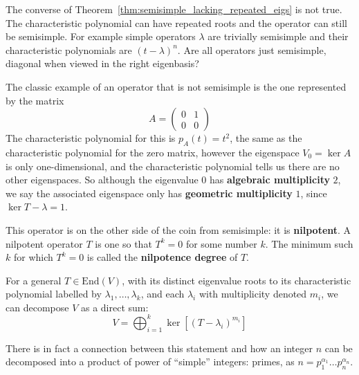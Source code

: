 \begin{appendices}
	The converse of Theorem~\ref{thm:semisimple_lacking_repeated_eigs} is not true. The characteristic polynomial can have repeated roots and the operator can still be semisimple. For example simple operators $\lambda$ are trivially semisimple and their characteristic polynomials are $(t-\lambda)^n$. Are all operators just semisimple, diagonal when viewed in the right eigenbasis?
	
	The classic example of an operator that is not semisimple is the one represented by the matrix
	\begin{equation*}
		A= \begin{pmatrix}
			 0 & 1 \\
			 0 & 0
		\end{pmatrix}
	\end{equation*}
	The characteristic polynomial for this is $p_A(t) = t^2$, the same as the characteristic polynomial for the zero matrix, however the eigenspace $V_0 = \ker A$ is only one-dimensional, and the characteristic polynomial tells us there are no other eigenspaces. So although the eigenvalue $0$ has \textbf{algebraic multiplicity} $2$, we say the associated eigenspace only has \textbf{geometric multiplicity} $1$, since $\ker T - \lambda = 1$.
	
	This operator is on the other side of the coin from semisimple: it is \textbf{nilpotent}. A nilpotent operator $T$ is one so that $T^k = 0$ for some number $k$. The minimum such $k$ for which $T^k = 0$ is called the \textbf{nilpotence degree} of $T$.
	

	\begin{theorem}
		For a general $T \in \mathrm{End}(V)$, with its distinct eigenvalue roots to its characteristic polynomial labelled by $\lambda_1, \dots, \lambda_k$, and each $\lambda_i$ with multiplicity denoted $m_i$, we can decompose $V$ as a direct sum:
		\begin{equation}
			V = \bigoplus_{i=1}^k \ker \left[ (T - \lambda_i)^{m_i} \right]
		\end{equation}
	\end{theorem}
	There is in fact a connection between this statement and how an integer $n$ can be decomposed into a product of power of ``simple'' integers: primes, as $n = p_1 ^{\alpha_1} \dots p_n ^{\alpha_n}$.





\end{appendices}
